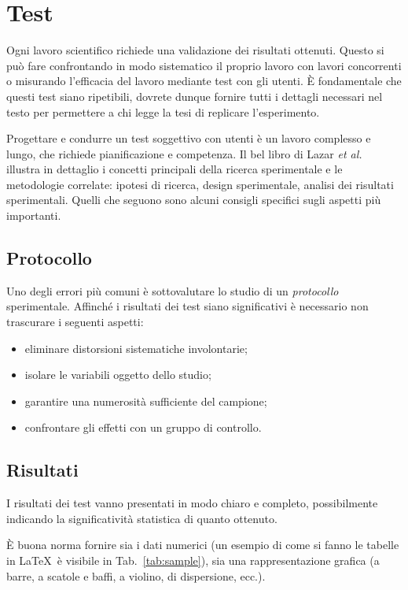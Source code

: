 \chapter{Test}
\label{chap:test}

Ogni lavoro scientifico richiede una validazione dei risultati ottenuti. Questo si può fare confrontando in modo sistematico il proprio lavoro con lavori concorrenti o misurando l'efficacia del lavoro mediante test con gli utenti. \`E fondamentale che questi test siano ripetibili, dovrete dunque fornire tutti i dettagli necessari nel testo per permettere a chi legge la tesi di replicare l'esperimento.

Progettare e condurre un test soggettivo con utenti \`e un lavoro complesso e lungo, che richiede pianificazione e competenza. Il bel libro di Lazar {\em et al.}~\cite{lazar2017methods} illustra in dettaglio i concetti principali della ricerca sperimentale e le metodologie correlate: ipotesi di ricerca, design sperimentale, analisi dei risultati sperimentali. Quelli che seguono sono alcuni consigli specifici sugli aspetti pi\`u importanti.

\section{Protocollo}

Uno degli errori più comuni è sottovalutare lo studio di un \textit{protocollo} sperimentale. Affinché i risultati dei test siano significativi è necessario non trascurare i seguenti aspetti:

\begin{itemize}
	\item eliminare distorsioni sistematiche involontarie;
	\item isolare le variabili oggetto dello studio;
	\item garantire una numerosità sufficiente del campione;
	\item confrontare gli effetti con un gruppo di controllo.
\end{itemize}

\section{Risultati}

I risultati dei test vanno presentati in modo chiaro e completo, possibilmente indicando la significatività statistica di quanto ottenuto.

\`E buona norma fornire sia i dati numerici (un esempio di come si fanno le tabelle in \LaTeX\  è visibile in Tab.\ \ref{tab:sample}), sia una rappresentazione grafica (a barre, a scatole e baffi, a violino, di dispersione, ecc.).

